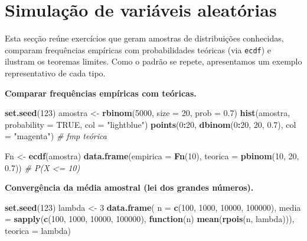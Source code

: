 \documentclass[
  portuguese,
  11pt,
  openany]{book}
\newenvironment{Shaded}{\begin{snugshade}}{\end{snugshade}}
\newcommand{\AttributeTok}[1]{\textcolor[rgb]{0.13,0.29,0.53}{#1}}
\newcommand{\CommentTok}[1]{\textcolor[rgb]{0.56,0.35,0.01}{\textit{#1}}}
\newcommand{\ConstantTok}[1]{\textcolor[rgb]{0.56,0.35,0.01}{#1}}
\newcommand{\ControlFlowTok}[1]{\textcolor[rgb]{0.13,0.29,0.53}{\textbf{#1}}}
\newcommand{\DecValTok}[1]{\textcolor[rgb]{0.00,0.00,0.81}{#1}}
\newcommand{\FloatTok}[1]{\textcolor[rgb]{0.00,0.00,0.81}{#1}}
\newcommand{\FunctionTok}[1]{\textcolor[rgb]{0.13,0.29,0.53}{\textbf{#1}}}
\newcommand{\NormalTok}[1]{#1}
\newcommand{\OtherTok}[1]{\textcolor[rgb]{0.56,0.35,0.01}{#1}}
\newcommand{\SpecialCharTok}[1]{\textcolor[rgb]{0.81,0.36,0.00}{\textbf{#1}}}
\newcommand{\StringTok}[1]{\textcolor[rgb]{0.31,0.60,0.02}{#1}}
\begin{document}
\section{Simulação de variáveis aleatórias}\label{simulauxe7uxe3o-de-variuxe1veis-aleatuxf3rias}

Esta secção reúne exercícios que geram amostras de distribuições conhecidas,
comparam frequências empíricas com probabilidades teóricas (via \texttt{ecdf}) e
ilustram os teoremas limites. Como o padrão se repete, apresentamos um exemplo
representativo de cada tipo.

\textbf{Comparar frequências empíricas com teóricas.}

\begin{Shaded}
\begin{Highlighting}[]
\FunctionTok{set.seed}\NormalTok{(}\DecValTok{123}\NormalTok{)}
\NormalTok{amostra }\OtherTok{\textless{}{-}} \FunctionTok{rbinom}\NormalTok{(}\DecValTok{5000}\NormalTok{, }\AttributeTok{size =} \DecValTok{20}\NormalTok{, }\AttributeTok{prob =} \FloatTok{0.7}\NormalTok{)}
\FunctionTok{hist}\NormalTok{(amostra, }\AttributeTok{probability =} \ConstantTok{TRUE}\NormalTok{, }\AttributeTok{col =} \StringTok{"lightblue"}\NormalTok{)}
\FunctionTok{points}\NormalTok{(}\DecValTok{0}\SpecialCharTok{:}\DecValTok{20}\NormalTok{, }\FunctionTok{dbinom}\NormalTok{(}\DecValTok{0}\SpecialCharTok{:}\DecValTok{20}\NormalTok{, }\DecValTok{20}\NormalTok{, }\FloatTok{0.7}\NormalTok{), }\AttributeTok{col =} \StringTok{"magenta"}\NormalTok{)   }\CommentTok{\# fmp teórica}

\NormalTok{Fn }\OtherTok{\textless{}{-}} \FunctionTok{ecdf}\NormalTok{(amostra)}
\FunctionTok{data.frame}\NormalTok{(}\AttributeTok{empirica =} \FunctionTok{Fn}\NormalTok{(}\DecValTok{10}\NormalTok{), }\AttributeTok{teorica =} \FunctionTok{pbinom}\NormalTok{(}\DecValTok{10}\NormalTok{, }\DecValTok{20}\NormalTok{, }\FloatTok{0.7}\NormalTok{))  }\CommentTok{\# P(X \textless{}= 10)}
\end{Highlighting}
\end{Shaded}

\textbf{Convergência da média amostral (lei dos grandes números).}

\begin{Shaded}
\begin{Highlighting}[]
\FunctionTok{set.seed}\NormalTok{(}\DecValTok{123}\NormalTok{)}
\NormalTok{lambda }\OtherTok{\textless{}{-}} \DecValTok{3}
\FunctionTok{data.frame}\NormalTok{(}
  \AttributeTok{n =} \FunctionTok{c}\NormalTok{(}\DecValTok{100}\NormalTok{, }\DecValTok{1000}\NormalTok{, }\DecValTok{10000}\NormalTok{, }\DecValTok{100000}\NormalTok{),}
  \AttributeTok{media =} \FunctionTok{sapply}\NormalTok{(}\FunctionTok{c}\NormalTok{(}\DecValTok{100}\NormalTok{, }\DecValTok{1000}\NormalTok{, }\DecValTok{10000}\NormalTok{, }\DecValTok{100000}\NormalTok{),}
                 \ControlFlowTok{function}\NormalTok{(n) }\FunctionTok{mean}\NormalTok{(}\FunctionTok{rpois}\NormalTok{(n, lambda))),}
  \AttributeTok{teorica =}\NormalTok{ lambda)}
\end{Highlighting}
\end{Shaded}
\end{document}
